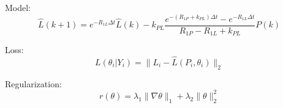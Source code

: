 \documentclass[10pt]{article}
\begin{document}
Model: 
\[
\hat L(k+1) = e^{-R_{1L} \Delta t} \hat L(k) -k_{PL} \frac{e^{-(R_{1P}+k_{PL})\Delta t} - e^{-R_{1L}\Delta t}}{R_{1P} - R_{1L} + k_{PL}} P(k)
\]

Loss: 
\[
L(\theta_i | Y_i) = \| L_i - \hat L(P_i, \theta_i) \|_2 
\]

Regularization:
\[
r(\theta) = \lambda_1 \| \nabla \theta \|_1 + \lambda_2 \|\theta\|_2^2 
\]
\end{document}
